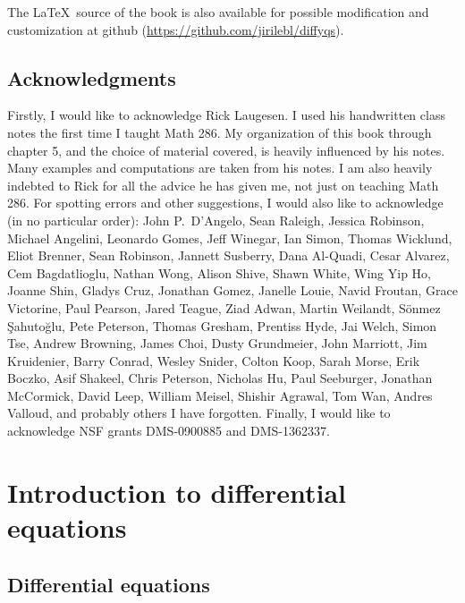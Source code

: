 The \LaTeX\ source of the book is also available
for possible modification and customization
at github (\url{https://github.com/jirilebl/diffyqs}).



\subsection{Acknowledgments}

Firstly, I would like to acknowledge Rick Laugesen.  I used his handwritten
class notes
the first time I taught
Math 286.  My organization of this book through chapter 5,
and the choice of
material covered, is heavily influenced by his notes.  Many
examples and computations are taken from his notes.  I am also heavily
indebted to Rick for all the advice he has given me, not just on teaching
Math 286.
For spotting errors and other suggestions,
I would also like to acknowledge (in no particular order):
John P.\ D'Angelo,
Sean Raleigh, Jessica Robinson, Michael Angelini, Leonardo Gomes, Jeff
Winegar, Ian Simon, Thomas Wicklund, Eliot Brenner, Sean Robinson,
Jannett Susberry, Dana Al-Quadi, Cesar Alvarez, Cem Bagdatlioglu,
Nathan Wong, Alison Shive, Shawn White, Wing Yip Ho, Joanne Shin,
Gladys Cruz, Jonathan Gomez, Janelle Louie, Navid Froutan,
Grace Victorine, Paul Pearson, Jared Teague, Ziad Adwan,
Martin Weilandt, S\"{o}nmez \c{S}ahuto\u{g}lu,
Pete Peterson, Thomas Gresham, Prentiss Hyde, Jai Welch,
Simon Tse, Andrew Browning, James Choi, Dusty Grundmeier,
John Marriott,
Jim Kruidenier,
Barry Conrad,
Wesley Snider,
Colton Koop,
Sarah Morse,
Erik Boczko,
Asif Shakeel,
Chris Peterson,
Nicholas Hu,
Paul Seeburger,
Jonathan McCormick,
David Leep,
William Meisel,
Shishir Agrawal,
Tom Wan,
Andres Valloud,
and probably others I
have forgotten.
Finally, I would like
to acknowledge NSF grants DMS-0900885 and DMS-1362337.



\sectionnewpage
\section{Introduction to differential equations}
\label{introde:section}


\subsection{Differential equations}


